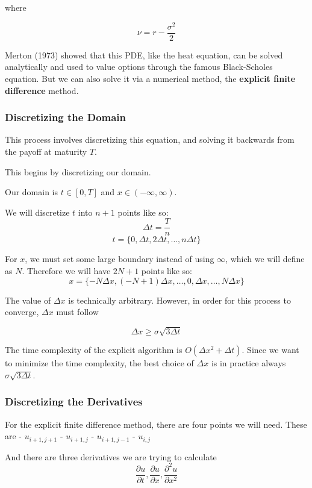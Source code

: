 \documentclass[11pt]{article}
\begin{document}
where

\[\nu = r - \frac{\sigma^2}{2}\]

    Merton (1973) showed that this PDE, like the heat equation, can be
solved analytically and used to value options through the famous
Black-Scholes equation. But we can also solve it via a numerical method,
the \textbf{explicit finite difference} method.

    \subsubsection{Discretizing the Domain}\label{discretizing-the-domain}

    This process involves discretizing this equation, and solving it
backwards from the payoff at maturity \(T\).

This begins by discretizing our domain.

Our domain is \(t \in [0, T]\) and \(x \in (-\infty, \infty)\).

We will discretize \(t\) into \(n + 1\) points like so:
\[\Delta t = \frac{T}{n}\]
\[t = \{0, \Delta t, 2 \Delta t, \ldots, n \Delta t\}\]

For \(x\), we must set some large boundary instead of using \(\infty\),
which we will define as \(N\). Therefore we will have \(2N + 1\) points
like so:
\[x = \{-N \Delta x, (-N + 1) \Delta x, \ldots, 0, \Delta x, \ldots, N \Delta x\}\]

The value of \(\Delta x\) is technically arbitrary. However, in order
for this process to converge, \(\Delta x\) must follow

\[\Delta x \geq \sigma \sqrt{3 \Delta t}\]

The time complexity of the explicit algorithm is
\(O(\Delta x^2 + \Delta t)\). Since we want to minimize the time
complexity, the best choice of \(\Delta x\) is in practice always
\(\sigma \sqrt{3\Delta t}\).

    \subsubsection{Discretizing the
Derivatives}\label{discretizing-the-derivatives}

    For the explicit finite difference method, there are four points we will
need. These are - \(u_{i+1, j+1}\) - \(u_{i+1, j}\) - \(u_{i+1, j-1}\) -
\(u_{i, j}\)

And there are three derivatives we are trying to calculate
\[\frac{\partial u}{\partial t}, \frac{\partial u}{\partial x}, \frac{\partial^2 u}{\partial x^2}\]
\end{document}
